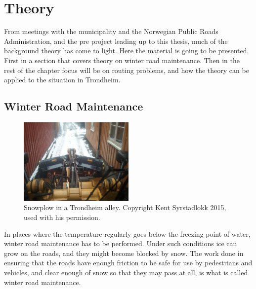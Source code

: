 \chapter{Theory}
\label{theory}

From meetings with the municipality and the Norwegian Public Roads Administration, and the pre project leading up to this thesis, much of the background theory has come to light. Here the material is going to be presented. First in a section that covers theory on winter road maintenance. Then in the rest of the chapter focus will be on routing problems, and how the theory can be applied to the situation in Trondheim.

\section{Winter Road Maintenance} %
\label{sec:snow_plowing}


\begin{figure}
	\begin{center}
		\includegraphics[width=0.5\textwidth]{figures/MachineryIllustrations/snowplow-Kent_Syrstadlokk-2012-04-18.jpg}
	\end{center}
	\caption{Snowplow in a Trondheim alley. Copyright Kent Syrstadlokk 2015, used with his permission.}
	\label{fig:snowplow_in_alley}
\end{figure}

In places where the temperature regularly goes below the freezing point of water, winter road maintenance has to be performed. Under such conditions ice can grow on the roads, and they might become blocked by snow. The work done in ensuring that the roads have enough friction to be safe for use by pedestrians and vehicles, and clear enough of snow so that they may pass at all, is what is called winter road maintenance.

